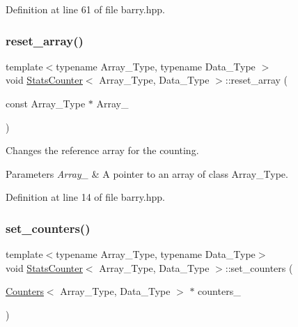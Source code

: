 Definition at line 61 of file barry.\+hpp.

\mbox{\label{classbarry_1_1_stats_counter_a8dabc3a7a9931acbb76900a67d728f70}} 
\subsubsection{\texorpdfstring{reset\+\_\+array()}{reset\_array()}}
{\footnotesize\ttfamily template$<$typename Array\+\_\+\+Type, typename Data\+\_\+\+Type $>$ \\
void \hyperlink{classbarry_1_1_stats_counter}{Stats\+Counter}$<$ Array\+\_\+\+Type, Data\+\_\+\+Type $>$\+::reset\+\_\+array (\begin{DoxyParamCaption}\item[{const Array\+\_\+\+Type $\ast$}]{Array\+\_\+ }\end{DoxyParamCaption})\hspace{0.3cm}{\ttfamily [inline]}}



Changes the reference array for the counting. 


\begin{DoxyParams}{Parameters}
{\em Array\+\_\+} & A pointer to an array of class {\ttfamily Array\+\_\+\+Type}. \\
\hline
\end{DoxyParams}


Definition at line 14 of file barry.\+hpp.

\mbox{\label{classbarry_1_1_stats_counter_a1d66f7d7326cac60a46ee56a8eb0a497}} 
\subsubsection{\texorpdfstring{set\+\_\+counters()}{set\_counters()}}
{\footnotesize\ttfamily template$<$typename Array\+\_\+\+Type, typename Data\+\_\+\+Type$>$ \\
void \hyperlink{classbarry_1_1_stats_counter}{Stats\+Counter}$<$ Array\+\_\+\+Type, Data\+\_\+\+Type $>$\+::set\+\_\+counters (\begin{DoxyParamCaption}\item[{\hyperlink{classbarry_1_1_counters}{Counters}$<$ Array\+\_\+\+Type, Data\+\_\+\+Type $>$ $\ast$}]{counters\+\_\+ }\end{DoxyParamCaption})\hspace{0.3cm}{\ttfamily [inline]}}



